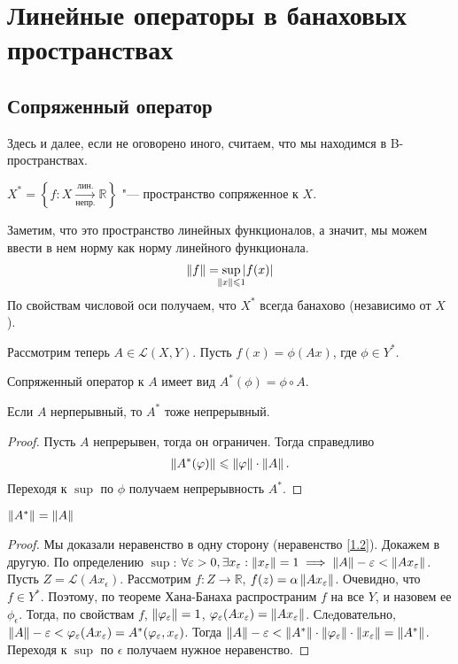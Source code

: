 \section{Линейные операторы в банаховых пространствах}
\subsection{Сопряженный оператор}

Здесь и далее, если не оговорено иного, считаем, что мы находимся в B-пространствах.

\begin{definition}
    $X^* = \left\{ f : X \xrightarrow[\text{непр.}]{\text{лин.}} \mathbb{R} \right\}$ "--- пространство сопряженное к $X$.
\end{definition}
Заметим, что это пространство линейных функционалов, а значит, мы можем ввести в нем норму как норму линейного функционала.
\begin{gather}
    \norm{f} = \sup_{\mathclap{\norm{x} \leqslant 1}} \abs{f(x)}
\end{gather}
По свойствам числовой оси получаем, что $X^*$ всегда банахово (независимо от $X$).

Рассмотрим теперь $A \in \mathcal{L}(X, Y)$. Пусть $f(x) = \phi(Ax)$, где $\phi \in Y^*$.
\begin{definition}
    Сопряженный оператор к $A$ имеет вид $A^*(\phi) = \phi \circ A$.
\end{definition}
\begin{statement}
    Если $A$ нерперывный, то $A^*$ тоже непрерывный.
\end{statement}
\begin{proof}
    Пусть $A$ непрерывен, тогда он ограничен. Тогда справедливо
    \begin{gather}
        \left\|A^*(\varphi)\right\| \leqslant \left\|\varphi\right\| \cdot \left\|A\right\|\text{.} \label{1.2}
    \end{gather}
    Переходя к $\sup$ по $\phi$ получаем непрерывность $A^*$.
\end{proof}
\begin{theorem} \label{th1.2}
    $\left\|A^*\right\| = \left\|A\right\|$
\end{theorem}
\begin{proof}
    Мы доказали неравенство в одну сторону (неравенство \ref{1.2}). Докажем в другую.
    По определению $\sup$:
    $\forall \varepsilon > 0, \exists x_{\varepsilon} : \left\|x_{\varepsilon}\right\| = 1 \implies \left\|A\right\| - \varepsilon < \left\|Ax_{\varepsilon}\right\|$.
    Пусть $Z = \mathcal{L}(Ax_{\epsilon})$. Рассмотрим $f : Z \rightarrow \mathbb{R}$, $f(z) = \alpha\left\|Ax_{\varepsilon}\right\|$.
    Очевидно, что $f \in Y^*$.
    Поэтому, по теореме Хана-Банаха распространим $f$ на все $Y$, и назовем ее $\phi_{\epsilon}$.
    Тогда, по свойствам $f$, $\left\|\varphi_{\varepsilon}\right\| = 1$, $\varphi_{\varepsilon}(Ax_{\varepsilon}) = \left\|Ax_{\varepsilon}\right\|$.
    Слeдовательно, $\left\|A\right\| - \varepsilon < \varphi_{\varepsilon}(Ax_{\varepsilon}) = A^*(\varphi_{\varepsilon}, x_{\varepsilon})$.
    Тогда $\left\|A\right\| - \varepsilon < \left\|A^*\right\| \cdot \left\|\varphi_{\varepsilon}\right\| \cdot \left\|x_{\varepsilon}\right\| = \left\|A^*\right\|$.
    Переходя к $\sup$ по $\epsilon$ получаем нужное неравенство.
\end{proof}

